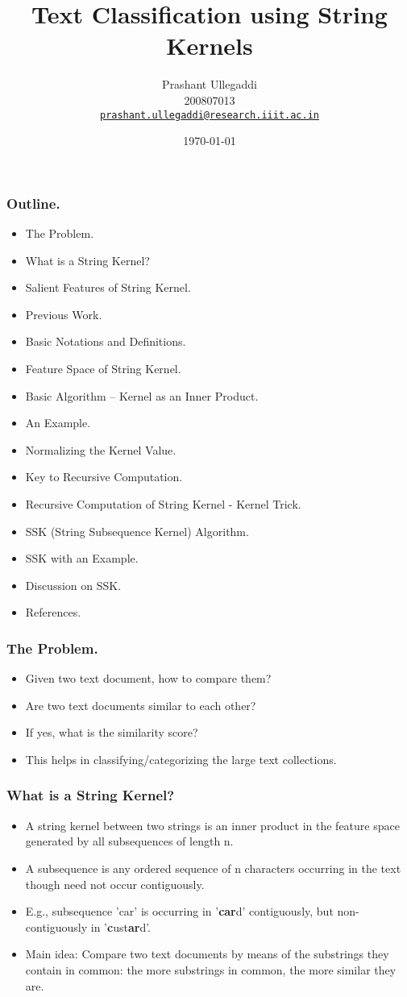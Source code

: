 \documentclass[10pt]{beamer}
\title{Text Classification using String Kernels}
\author{Prashant Ullegaddi\\ 200807013\\
	\href{mailto:prashant.ullegaddi@research.iiit.ac.in}{\texttt{prashant.ullegaddi@research.iiit.ac.in}}}
\date{\today}
\begin{document}
\maketitle

\begin{frame}
	\frametitle{Outline.}
		\begin{itemize}
			\item The Problem.
			\item What is a String Kernel?
			\item Salient Features of String Kernel.
			\item Previous Work.
			\item Basic Notations and Definitions.
			\item Feature Space of String Kernel.
			\item Basic Algorithm -- Kernel as an Inner Product.
			\item An Example.
			\item Normalizing the Kernel Value.
			\item Key to Recursive Computation.
			\item Recursive Computation of String Kernel - Kernel Trick.
			\item SSK (String Subsequence Kernel) Algorithm.
			\item SSK with an Example.
			\item Discussion on SSK.
			\item References.
		\end{itemize}
\end{frame}

\begin{frame}
	\frametitle{The Problem.}
		\begin{itemize}
		\item Given two text document, how to compare them?
		\item Are two text documents similar to each other?
		\item If yes, what is the similarity score?
		\item This helps in classifying/categorizing the large text collections.
		\end{itemize}
\end{frame}

\begin{frame}
	\frametitle{What is a String Kernel?}
	\begin{itemize}
		\item A string kernel between two strings is an inner product in the feature space generated by all subsequences of 
				length n.
		\item A subsequence is any ordered sequence of n characters occurring in the text though need not occur contiguously.
		\item E.g., subsequence 'car' is occurring in '\textbf{car}d' contiguously, but non-contiguously in '\textbf{c}ust\textbf{ar}d'.
		\item Main idea: Compare two text documents by means of the substrings they contain in common: the more substrings in common, the more similar they are.
	\end{itemize}
\end{frame}
\end{document}
